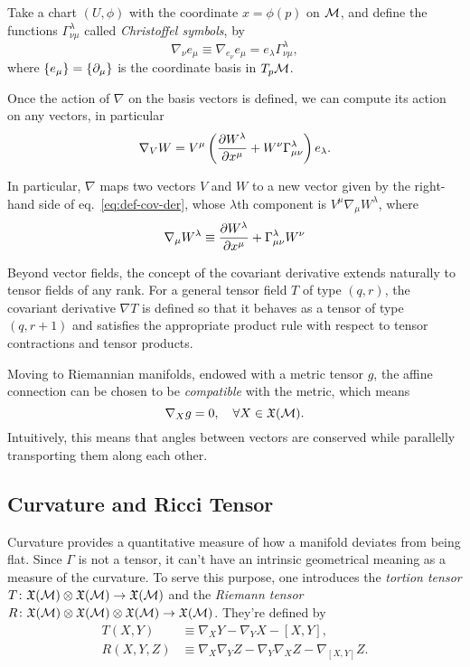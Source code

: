 Take a chart $(U, \phi)$ with the coordinate $x = \phi(p)$ on $\mathcal{M}$, and define the functions $\Gamma^\lambda_{\nu\mu}$ called \emph{Christoffel symbols}, by
\begin{equation}
    \nabla_\nu e_\mu \equiv \nabla_{e_\nu} e_\mu = e_\lambda \Gamma^\lambda_{\nu\mu},
\end{equation}
where $\{e_\mu\} = \{\partial_\mu\}$ is the coordinate basis in $T_p \mathcal{M}$.

Once the action of $\nabla$ on the basis vectors is defined, we can compute its action on any vectors, in particular
\begin{equation}\label{eq:def-cov-der}
    \nabla_V W = V^\mu \left( \frac{\partial W^\lambda}{\partial x^\mu} + W^\nu \Gamma^\lambda_{\mu\nu} \right) e_\lambda .
\end{equation}

In particular, $\nabla$ maps two vectors $V$ and $W$ to a new vector given by the right-hand side of eq.~\eqref{eq:def-cov-der}, whose $\lambda$th component is $V^\mu \nabla_\mu W^\lambda$, where
\begin{equation}
    \nabla_\mu W^\lambda \equiv \frac{\partial W^\lambda}{\partial x^\mu} + \Gamma^\lambda_{\mu\nu} W^\nu
\end{equation}

Beyond vector fields, the concept of the covariant derivative extends naturally to tensor fields of any rank. For a general tensor field $T$ of type $(q, r)$, the covariant derivative $\nabla T$ is defined so that it behaves as a tensor of type $(q, r+1)$ and satisfies the appropriate product rule with respect to tensor contractions and tensor products.

Moving to Riemannian manifolds, endowed with a metric tensor $g$, the affine connection can be chosen to be \emph{compatible} with the metric, which means
\begin{equation}
    \nabla_X g = 0, \quad \forall X \in \mathfrak{X}(\mathcal{M}).
\end{equation}
Intuitively, this means that angles between vectors are conserved while parallelly transporting them along each other.

\subsection{Curvature and Ricci Tensor}

Curvature provides a quantitative measure of how a manifold deviates from being flat. Since $\Gamma$ is not a tensor, it can't have an intrinsic geometrical meaning as a measure of the curvature. To serve this purpose, one introduces the \emph{tortion tensor} $T \colon \mathfrak{X}(\mathcal{M}) \otimes \mathfrak{X}(\mathcal{M}) \to \mathfrak{X}(\mathcal{M}) $ and the \emph{Riemann tensor} $R \colon \mathfrak{X}(\mathcal{M}) \otimes \mathfrak{X}(\mathcal{M}) \otimes \mathfrak{X}(\mathcal{M}) \to \mathfrak{X}(\mathcal{M}) $. They're defined by
\begin{align}
    T(X, Y) &\equiv \nabla_X Y - \nabla_Y X - [X,Y], \\
    R(X,Y,Z) &\equiv \nabla_X \nabla_Y Z - \nabla_Y \nabla_X Z - \nabla_{[X,Y]} Z. \label{eq:def-riemann}
\end{align}

